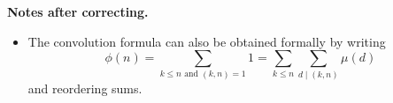 \documentclass[a4paper,11pt]{article}
\begin{document}
\textbf{Notes after correcting.} \leavevmode
\begin{itemize}
    \item The convolution formula can also be obtained formally by writing
        \[
            \phi(n) = \sum_{k \leq n \text{ and } (k,n) = 1} 1 = \sum_{k \leq
            n} \sum_{d \mid (k,n)} \mu(d)
        \]
        and reordering sums.
\end{itemize}
\end{document}
